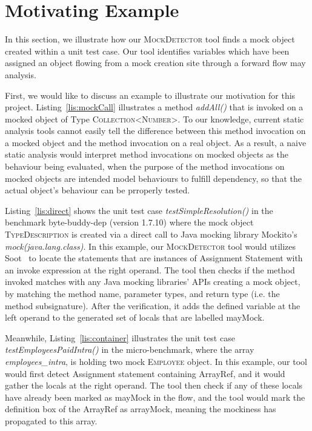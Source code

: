 \section{Motivating Example}
\label{sec:motivating-example}

In this section, we illustrate how our \textsc{MockDetector} tool finds a mock object created within a unit test case. Our tool identifies variables which have been assigned an object flowing from a mock creation site through a forward flow may analysis.

First, we would like to discuss an example to illustrate our motivation for this project. Listing~\ref{lis:mockCall} illustrates a method \textit{addAll()} that is invoked on a mocked object of Type \textsc{Collection<Number>}. To our knowledge, current static analysis tools cannot easily tell the difference between this method invocation on a mocked object and the method invocation on a real object. As a result, a naive static analysis would interpret method invocations on mocked objects as the behaviour being evaluated, when the purpose of the method invocations on mocked objects are intended model behaviours to fulfill dependency, so that the actual object's behaviour can be prroperly tested.

Listing~\ref{lis:direct} shows the unit test case \textit{testSimpleResolution()} in the benchmark byte-buddy-dep (version 1.7.10) where the mock object \textsc{TypeDescription} is created via a direct call to Java mocking library Mockito's \textit{mock(java.lang.class)}. In this example, our \textsc{MockDetector} tool would utilizes Soot~\cite{Vallee-Rai:1999:SJB:781995.782008} to locate the statements that are instances of Assignment Statement with an invoke expression at the right operand. The tool then checks if the method invoked matches with any Java mocking libraries' APIs creating a mock object, by matching the method name, parameter types, and return type (i.e. the method subsignature).  After the verification, it adds the defined variable at the left operand to the generated set of locals that are labelled mayMock.

Meanwhile, Listing~\ref{lis:container} illustrates the unit test case \textit{testEmployeesPaidIntra()} in the micro-benchmark, where the array \textit{employees\_intra}, is holding two mock \textsc{Employee} object. In this example, our tool would first detect Assignment statement containing ArrayRef, and it would gather the locals at the right operand. The tool then check if any of these locals have already been marked as mayMock in the flow, and the tool would mark the definition box of the ArrayRef as arrayMock, meaning the mockiness has propagated to this array. 

